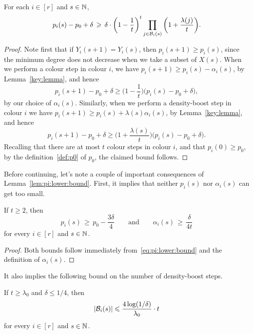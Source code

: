 \begin{lemma}\label{lem:pi:lower:bound}
  For each $i \in [r]$ and $s \in \mathbb{N}$, 
  \begin{equation}\label{eq:pi:lower:bound}
    p_i(s) - p_0 + \delta \, \geqslant \, \delta \cdot \bigg( 1 - \frac{1}{t} \bigg)^{t} \prod_{j \in \mathcal{B}_i(s)} \bigg( 1 + \frac{\lambda(j)}{t} \bigg).
  \end{equation}
\end{lemma}
  
\begin{proof}
  Note first that if $Y_i(s+1) = Y_i(s)$, then $p_i(s+1) \ge p_i(s)$, since the minimum degree does not decrease when we take a subset of $X(s)$. When we perform a colour step in colour $i$, %
  we have $p_i(s+1) \ge p_i(s) - \alpha_i(s)$, by Lemma~\ref{key:lemma}, and hence
  $$p_i(s+1) - p_0 + \delta \ge \bigg( 1 - \frac{1}{t} \bigg) \big( p_i(s) - p_0 + \delta \big),$$
  by our choice of $\alpha_i(s)$. Similarly, when we perform a density-boost step in colour $i$  
  we have $p_i(s+1) \ge p_i(s) + \lambda(s) \alpha_i(s)$, by Lemma~\ref{key:lemma}, and hence
  $$p_i(s+1) - p_0 + \delta \ge \bigg( 1 + \frac{\lambda(s)}{t} \bigg) \big( p_i(s) - p_0 + \delta \big).$$
  Recalling that there are at most $t$ colour steps in colour $i$, and that $p_i(0) \ge p_0$, by the definition~\eqref{def:p0} of $p_0$, the claimed bound follows. 
\end{proof}

Before continuing, let's note a couple of important consequences of Lemma~\ref{lem:pi:lower:bound}. First, it implies that neither $p_i(s)$ nor $\alpha_i(s)$ can get too small. 

\begin{lemma}\label{lem:pi:min}
  If\/ $t \ge 2$, then 
  $$p_i(s) \, \ge \, p_0 - \frac{3\delta}{4} \qquad \text{and} \qquad \alpha_i(s) \, \ge \, \frac{\delta}{4t}$$
  for every $i \in [r]$ and $s \in \mathbb{N}$. 
\end{lemma}

\begin{proof}
  Both bounds follow immediately from~\eqref{eq:pi:lower:bound} and the definition of $\alpha_i(s)$. 
\end{proof}
  
It also implies the following bound on the number of density-boost steps. 

\begin{lemma}\label{lem:Bi:max}
  If\/ $t \ge \lambda_0$ and\/ $\delta \le 1/4$, then
  $$|\mathcal{B}_i(s)| \leqslant \frac{4 \log(1/\delta)}{\lambda_0} \cdot t$$
  for every $i \in [r]$ and $s \in \mathbb{N}$. 
\end{lemma}
  
